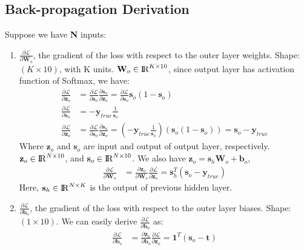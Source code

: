 \documentclass[10pt,letterpaper]{article}
\begin{document}
\subsection{Back-propagation Derivation}

Suppose we have \textbf{N} inputs:
\begin{enumerate}
  \item $\frac{\partial \mathcal{L}}{\partial  \textbf{W}_o}$, the gradient of the loss with respect to the outer layer weights. Shape: $(K \times 10)$, with K units. $\textbf{W}_o\in {\rm I\!R}^{K\times 10}$, since output layer has activation function of Softmax, we have: 
  \begin{align*}
      \frac{\partial \mathcal{L}}{\partial  \textbf{z}_{o}} &= \frac{\partial \mathcal{L}}{\partial  \textbf{s}_{o}}\frac{\partial \textbf{s}_{o}}{\partial  \textbf{z}_{o}} = \frac{\partial \mathcal{L}}{\partial  \textbf{s}_{o}}\textbf{s}_{o}(1-\textbf{s}_{o}) \\
      \frac{\partial \mathcal{L}}{\partial  \textbf{s}_{o}} &= -\textbf{y}_{true}\frac{1}{\textbf{s}_{o}} \\
      \frac{\partial \mathcal{L}}{\partial  \textbf{z}_{o}} &=  \frac{\partial \mathcal{L}}{\partial  \textbf{s}_{o}} \frac{\partial \textbf{s}_{o}}{\partial  \textbf{z}_{o}} =(-\textbf{y}_{true}\frac{1}{\textbf{s}_{o}})(\textbf{s}_{o}(1-\textbf{s}_{o}))= \textbf{s}_{o} - \textbf{y}_{true}
  \end{align*}
  Where $\textbf{z}_{o}$ and $\textbf{s}_{o}$ are input and output of output layer, respectively. $\textbf{z}_{o} \in {\rm I\!R}^{N\times 10}$, and $\textbf{s}_{o} \in {\rm I\!R}^{N\times 10}$. We also have $ \textbf{z}_{o} = \textbf{s}_{h}\textbf{W}_{o} + \textbf{b}_{o}$, 
    \begin{align*}
      \frac{\partial \mathcal{L}}{\partial  \textbf{W}_o} &= \frac{\partial \textbf{z}_{o}}{\partial  \textbf{W}_{o}}\frac{\partial \mathcal{L}}{\partial  \textbf{z}_{o}} =\textbf{s}_{h}^{T}(\textbf{s}_{o} - \textbf{y}_{true}) 
  \end{align*}
  Here, $\textbf{s}_{h}\in {\rm I\!R}^{N\times K}$ is the output of previous hidden layer. 
  
  
  
  \item $\frac{\partial \mathcal{L}}{\partial  \textbf{b}_o}$, the gradient of the loss with respect to the outer layer biases. Shape:$(1 \times 10)$.
  We can easily derive $\frac{\partial \mathcal{L}}{\partial  \textbf{b}_o} $ as:
  \begin{align*}
      \frac{\partial \mathcal{L}}{\partial  \textbf{b}_o} &= \frac{\partial \textbf{z}_o}{\partial  \textbf{b}_o}\frac{\partial \mathcal{L}}{\partial  \textbf{z}_o} =\textbf{1}^T (\textbf{s}_{o} - \textbf{t}) 
  \end{align*}
  

\end{enumerate}
\end{document}
